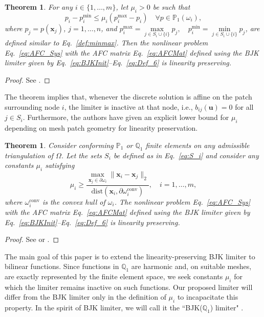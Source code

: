 \documentclass[a4paper]{article}
\theoremstyle{plain}
\newtheorem{theorem}[lemma]{Theorem}
\theoremstyle{definition}
\theoremstyle{remark}
\begin{document}
\begin{theorem}
	\textit{For any $i \in \{1, \dots, m\}$, let $\mu_i > 0$ be such that}
	\begin{equation}
		p_i - p_i^{\min} \le \mu_i (p_i^{\max} - p_i) \quad \forall p \in \mathbb{P}_1(\omega_i), \label{eq:condition}
	\end{equation}
	\textit{where $p_j = p(\mathbf{x}_j)$, $j = 1, \dots, n$, and $p_i^{\max} = \max\limits_{j \in S_i \cup \{i\}} p_j, \quad p_i^{\min} = \min\limits_{j \in S_i \cup \{i\}} p_j $,  are defined similar to Eq.~\eqref{def:minmax}. Then the nonlinear problem Eq.~\eqref{eq:AFC_Sys} with the AFC matrix Eq.~\eqref{eq:AFCMat} defined using the BJK limiter given by Eq.~\eqref{eq:BJKInit}--Eq.~\eqref{eq:Def_6} is linearity preserving.}
\label{Thm:LP}	
\end{theorem}
\begin{proof}
  See \cite[Lemma~10.9]{BJK25}.
\end{proof}

The theorem implies that, whenever the discrete solution is affine on the patch surrounding node $i$, the limiter is inactive at that node, i.e., $b_{ij}(\mathbf u)=0$ for all $j\in S_i$. Furthermore, the authors have given an explicit lower bound for $\mu_i$ depending on mesh patch geometry for linearity preservation.

\begin{theorem}
	Consider conforming $\mathbb{P}_1$ or $\mathbb{Q}_1$ finite elements on any admissible triangulation of $\Omega$. Let the sets $S_i$ be defined as in Eq.~\eqref{eq:S_i}  and consider any constants $\mu_i$ satisfying
	\begin{equation}
		\mu_i \ge \frac{\max_{\mathbf{x}_j \in \partial\omega_i} \|\mathbf{x}_i - \mathbf{x}_j\|_2}{\mathrm{dist}\left(\mathbf{x}_i, \partial\omega_i^{\text{conv}}\right)}, \quad i = 1, \dots, m,
	\end{equation}
	where $\omega_i^{\text{conv}}$ is the convex hull of $\omega_i$. The nonlinear problem Eq.~\eqref{eq:AFC_Sys} with the AFC matrix Eq.~\eqref{eq:AFCMat} defined using the BJK limiter given by Eq.~\eqref{eq:BJKInit}--Eq.~\eqref{eq:Def_6} is linearity preserving.
\end{theorem}
\begin{proof}
 See \cite[Theorem~6.1]{BJK17} or \cite[Theorem~10.42]{BJK25}.
\end{proof}

The main goal of this paper is to extend the linearity-preserving BJK limiter to bilinear functions. Since functions in $\mathbb Q_1$ are harmonic and, on suitable meshes, are exactly represented by the finite element space, we seek constants \(\mu_i\) for which the limiter remains inactive on such functions. Our proposed limiter will differ from the BJK limiter only in the definition of $\mu_i$ to incapacitate this property. In the spirit of BJK limiter, we will call it the  ``BJK($ \mathbb{Q}_1 $) limiter" . 
 
\end{document}
